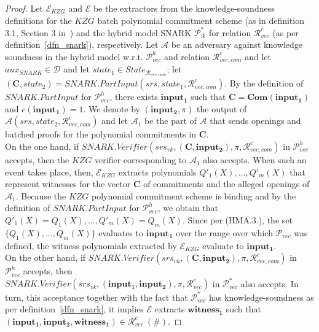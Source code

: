 \begin{proof} Let $\mathcal{E}_{\mathit{KZG}}$ and $\mathcal{E}$ be the extractors from the knowledge-soundness definitions for the 
$\mathit{KZG}$ batch polynomial commitment scheme (as in definition 3.1, Section 3 in~\cite{plonk}) and the hybrid model 
SNARK $\mathscr{P}^*_{\mathcal{R}}$ for relation $\mathcal{R}^c_{\mathit{vec}}$ (as per definition~\ref{dfn_snark}), respectively. 
Let $\mathcal{A}$ be an adversary against knowledge soundness in the hybrid model w.r.t. 
$\mathscr{P}_{\mathit{vec}}^{h}$ and relation $\mathcal{R}_{\mathit{vec}, \mathit{com}}^c$ and let $\mathit{aux}_{\mathit{SNARK}} \in \mathcal{D}$ 
and let $\mathit{state_1} \in \mathit{State}_{\mathcal{R}_{\mathit{vec}, \mathit{com}}}$; let 
$(\mathbf{C},\mathit{state_2}) = \mathit{SNARK.PartInput}(\mathit{srs}, \mathit{state_1}, \mathcal{R}_{\mathit{vec}, \mathit{com}}^c)$. 
By the definition of $\mathit{SNARK.PartInput}$ for $\mathscr{P}_{\mathit{vec}}^{h}$, there exists 
$\mathbf{input_1}$ such that $\mathbf{C} = \mathbf{Com}(\mathbf{input_1})$ and $c(\mathbf{input_1}) = 1$. 
We denote by $(\mathbf{input_2}, \pi)$ the output of $\mathcal{A}(\mathit{srs}, \mathit{state_2},  \mathcal{R}_{\mathit{vec}, \mathit{com}}^c)$ 
and let $\mathcal{A}_1$ be the part of $\mathcal{A}$ that sends openings and batched proofs for the polynomial commitments in 
$\mathbf{C}$. \\

\noindent On the one hand, if $\mathit{SNARK.Verifier}(\mathit{srs}_{\mathit{vk}}, (\mathbf{C},\mathbf{input_2}),\pi,\mathcal{R}_{\mathit{vec}, \mathit{com}}^c)$ 
in $\mathscr{P}_{\mathit{vec}}^{h}$ accepts, then the $\mathit{KZG}$ verifier corresponding to 
$\mathcal{A}_1$ also accepts. When such an event takes place, then, \ewnp $\mathcal{E}_{\mathit{KZG}}$ extracts polynomials 
$Q'_1(X), \ldots, Q'_m(X)$ that represent witnesses for the vector $\mathbf{C}$ of commitments and the alleged openings of $\mathcal{A}_1$. 
Because the $\mathit{KZG}$ polynomial commitment scheme is binding and by the definition of 
$\mathit{SNARK.PartInput}$ for $\mathscr{P}_{\mathit{vec}}^{h}$, we obtain that $Q'_1(X) = Q_1(X), \ldots, Q'_m(X) = Q_m(X).$ 
Since per (HMA.3.), the set $\{Q_1(X), \ldots, Q_m(X)\}$ evaluates to $\mathbf{input_1}$ over the range over which $\mathscr{P}_{\mathit{vec}}$ 
was defined, \ewnp the witness polynomials extracted by $\mathcal{E}_{\mathit{KZG}}$ evaluate to $\mathbf{input_1}$. \\

\noindent On the other hand, if $\mathit{SNARK.Verifier}(\mathit{srs}_{\mathit{vk}}, (\mathbf{C},\mathbf{input_2}),\pi,\mathcal{R}_{\mathit{vec}, \mathit{com}}^c)$ 
in $\mathscr{P}_{\mathit{vec}}^{h}$ accepts, then \\
$\mathit{SNARK.Verifier}(\mathit{srs}_{\mathit{vk}}, (\mathbf{input_1},\mathbf{input_2}),\pi,\mathcal{R}_{\mathit{vec}}^c)$ 
in $\mathscr{P}_{\mathit{vec}}^{*}$ also accepts. In turn, this acceptance together with the fact that $\mathscr{P}_{\mathit{vec}}^{*}$ 
has knowledge-soundness as per definition~\ref{dfn_snark}, it implies $\mathcal{E}$ \ewnp extracts $\mathbf{witness_1}$ 
such that $(\mathbf{input_1}, \mathbf{input_2}, \mathbf{witness_1}) \in \mathcal{R}_{\mathit{vec}}^{c} \ (\#).$ 


\end{proof}
